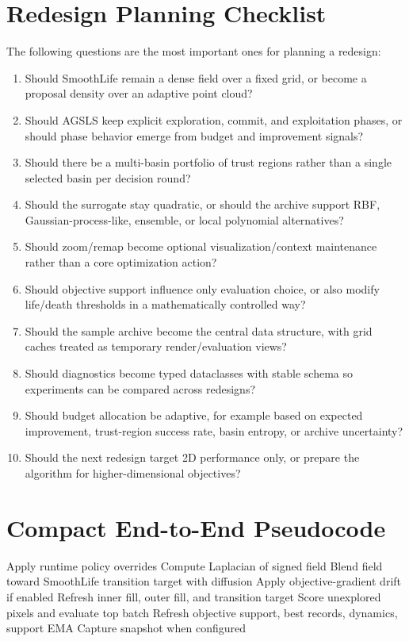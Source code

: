 \documentclass[11pt]{article}
\begin{document}
\section{Redesign Planning Checklist}

The following questions are the most important ones for planning a redesign:

\begin{enumerate}
\item Should SmoothLife remain a dense field over a fixed grid, or become a
proposal density over an adaptive point cloud?
\item Should AGSLS keep explicit exploration, commit, and exploitation phases,
or should phase behavior emerge from budget and improvement signals?
\item Should there be a multi-basin portfolio of trust regions rather than a
single selected basin per decision round?
\item Should the surrogate stay quadratic, or should the archive support RBF,
Gaussian-process-like, ensemble, or local polynomial alternatives?
\item Should zoom/remap become optional visualization/context maintenance
rather than a core optimization action?
\item Should objective support influence only evaluation choice, or also
modify life/death thresholds in a mathematically controlled way?
\item Should the sample archive become the central data structure, with grid
caches treated as temporary render/evaluation views?
\item Should diagnostics become typed dataclasses with stable schema so
experiments can be compared across redesigns?
\item Should budget allocation be adaptive, for example based on expected
improvement, trust-region success rate, basin entropy, or archive uncertainty?
\item Should the next redesign target 2D performance only, or prepare the
algorithm for higher-dimensional objectives?
\end{enumerate}

\section{Compact End-to-End Pseudocode}

\begin{algorithm}
\caption{Current SmoothLifeSearch step}
\begin{algorithmic}[1]
    \State Apply runtime policy overrides
    \State Compute Laplacian of signed field
    \State Blend field toward SmoothLife transition target with diffusion
    \State Apply objective-gradient drift if enabled
    \State Refresh inner fill, outer fill, and transition target
    \State Score unexplored pixels and evaluate top batch
    \State Refresh objective support, best records, dynamics, support EMA
    \State Capture snapshot when configured
\EndFor
\end{algorithmic}
\label{alg:smoothlife-step}
\end{algorithm}
\end{document}
